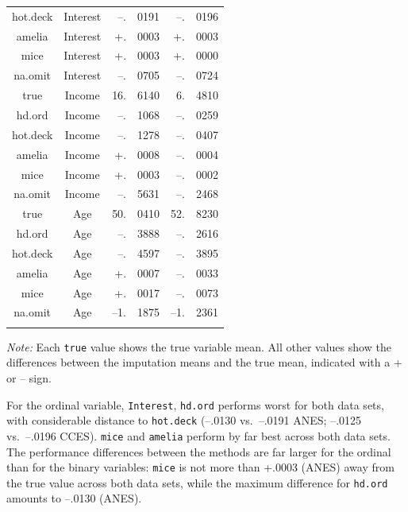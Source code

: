 \documentclass[12pt,econ]{sources/authesis}
\begin{document}
\begin{table}[!htbp]
\begin{threeparttable}
\begin{tabular}{ccr@{}lr@{}l}
 hot.deck & Interest & --.&0191 & --.&0196 \\ 
 amelia & Interest & +.&0003 & +.&0003 \\ 
 mice & Interest & +.&0003 & +.&0000 \\
 na.omit & Interest & --.&0705 & --.&0724 \\
 true & Income & 16.&6140 & 6.&4810 \\
 hd.ord & Income & --.&1068 & --.&0259 \\
 hot.deck & Income & --.&1278 & --.&0407 \\
 amelia & Income & +.&0008 & --.&0004 \\
 mice & Income & +.&0003 & --.&0002 \\
 na.omit & Income & --.&5631 & --.&2468 \\
 true & Age & 50.&0410 & 52.&8230 \\
 hd.ord & Age & --.&3888 & --.&2616 \\
 hot.deck & Age & --.&4597 & --.&3895 \\
 amelia & Age & +.&0007 & --.&0033 \\
 mice & Age & +.&0017 & --.&0073 \\
 na.omit & Age & --1.&1875 & --1.&2361 \\
 \hline \\[-1.8ex]  
\end{tabular} 
\begin{tablenotes}
\footnotesize{\textit{Note:} Each \texttt{true} value shows the true variable mean. All other values show the differences between the imputation means and the true mean, indicated with a + or -- sign.}
\end{tablenotes}
\end{threeparttable}
\end{table}
For the ordinal variable, \texttt{Interest}, \texttt{hd.ord} performs worst for both data sets, with considerable distance to \texttt{hot.deck} (--.0130 vs.~--.0191 ANES; --.0125 vs.~--.0196 CCES). \texttt{mice} and \texttt{amelia} perform by far best across both data sets. The performance differences between the methods are far larger for the ordinal than for the binary variables: \texttt{mice} is not more than +.0003 (ANES) away from the true value across both data sets, while the maximum difference for \texttt{hd.ord} amounts to --.0130 (ANES).
\end{document}
